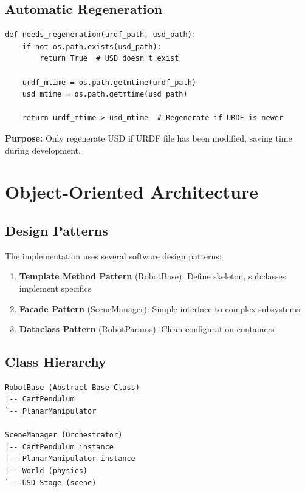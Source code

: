 \documentclass[11pt,a4paper]{article}
\begin{document}
\subsection{Automatic Regeneration}

\begin{lstlisting}
def needs_regeneration(urdf_path, usd_path):
    if not os.path.exists(usd_path):
        return True  # USD doesn't exist
    
    urdf_mtime = os.path.getmtime(urdf_path)
    usd_mtime = os.path.getmtime(usd_path)
    
    return urdf_mtime > usd_mtime  # Regenerate if URDF is newer
\end{lstlisting}

\textbf{Purpose:} Only regenerate USD if URDF file has been modified, saving time during development.

\section{Object-Oriented Architecture}

\subsection{Design Patterns}

The implementation uses several software design patterns:

\begin{enumerate}
    \item \textbf{Template Method Pattern} (RobotBase): Define skeleton, subclasses implement specifics
    \item \textbf{Facade Pattern} (SceneManager): Simple interface to complex subsystems
    \item \textbf{Dataclass Pattern} (RobotParams): Clean configuration containers
\end{enumerate}

\subsection{Class Hierarchy}

\begin{verbatim}
RobotBase (Abstract Base Class)
|-- CartPendulum
`-- PlanarManipulator

SceneManager (Orchestrator)
|-- CartPendulum instance
|-- PlanarManipulator instance
|-- World (physics)
`-- USD Stage (scene)
\end{verbatim}
\end{document}
